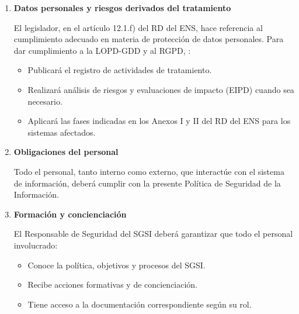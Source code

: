 \begin{enumerate}[label=\alph*)]
\textbf{Designaci\'on y resoluci\'on de conflictos:}
\begin{itemize}
  \item La creaci\'on y constituci\'on del Comit\'e, as\'i como la designaci\'on de sus miembros, se formalizar\'a mediante acta inicial.
  \item Los roles nombrados se renovar\'an autom\'aticamente cada a\~no. Cualquier cambio se comunicar\'a siguiendo el procedimiento establecido.
  \item Seg\'un el art\'iculo 13.3 del RD del ENS, no puede existir dependencia jer\'arquica entre el RSEG y el RSIS, salvo excepciones justificadas. En tal caso, se establecer\'an medidas compensatorias.
\end{itemize}

\item \textbf{Datos personales y riesgos derivados del tratamiento}

El legislador, en el art\'iculo 12.1.f) del RD del ENS, hace referencia al cumplimiento adecuado en materia de protecci\'on de datos personales. Para dar cumplimiento a la LOPD-GDD y al RGPD, \Beneficiario{}:

\begin{itemize}
  \item Publicar\'a el registro de actividades de tratamiento.
  \item Realizar\'a an\'alisis de riesgos y evaluaciones de impacto (EIPD) cuando sea necesario.
  \item Aplicar\'a las fases indicadas en los Anexos I y II del RD del ENS para los sistemas afectados.
\end{itemize}

\item \textbf{Obligaciones del personal}

Todo el personal, tanto interno como externo, que interact\'ue con el sistema de informaci\'on, deber\'a cumplir con la presente Pol\'itica de Seguridad de la Informaci\'on.

\item \textbf{Formaci\'on y concienciaci\'on}

El Responsable de Seguridad del SGSI deber\'a garantizar que todo el personal involucrado:

\begin{itemize}
  \item Conoce la pol\'itica, objetivos y procesos del SGSI.
  \item Recibe acciones formativas y de concienciaci\'on.
  \item Tiene acceso a la documentaci\'on correspondiente seg\'un su rol.
\end{itemize}


\end{enumerate}
